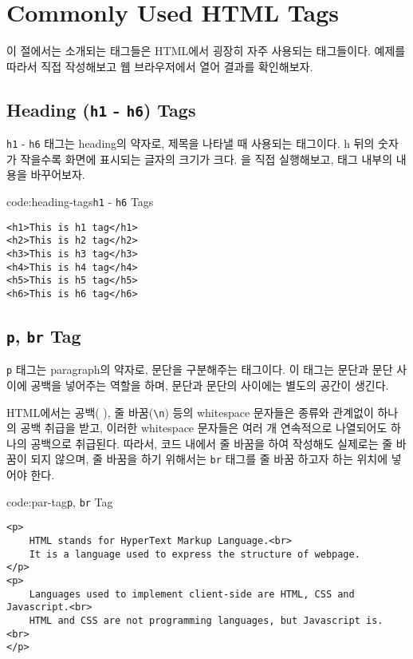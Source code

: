 \section{Commonly Used HTML Tags} \label{sect:commonly-used-html-tags}

이 절에서는 소개되는 태그들은 HTML에서 굉장히 자주 사용되는 태그들이다. 예제를 따라서 직접 작성해보고 웹 브라우저에서 열어 결과를 확인해보자.

\subsection*{Heading (\texttt{h1} - \texttt{h6}) Tags}
\texttt{h1} - \texttt{h6} 태그는 heading의 약자로, 제목을 나타낼 때 사용되는 태그이다. h 뒤의 숫자가 작을수록 화면에 표시되는 글자의 크기가 크다. 을 직접 실행해보고, 태그 내부의 내용을 바꾸어보자.

\begin{codeenv}{code:heading-tags}{\texttt{h1} - \texttt{h6} Tags}\begin{verbatim}
<h1>This is h1 tag</h1>
<h2>This is h2 tag</h2>
<h3>This is h3 tag</h3>
<h4>This is h4 tag</h4>
<h5>This is h5 tag</h5>
<h6>This is h6 tag</h6>
\end{verbatim}
\end{codeenv}

\subsection*{\texttt{p}, \texttt{br} Tag}
\texttt{p} 태그는 paragraph의 약자로, 문단을 구분해주는 태그이다. 이 태그는 문단과 문단 사이에 공백을 넣어주는 역할을 하며, 문단과 문단의 사이에는 별도의 공간이 생긴다. 

HTML에서는 공백( ), 줄 바꿈(\verb|\n|) 등의 whitespace 문자들은 종류와 관계없이 하나의 공백 취급을 받고, 이러한 whitespace 문자들은 여러 개 연속적으로 나열되어도 하나의 공백으로 취급된다. 따라서, 코드 내에서 줄 바꿈을 하여 작성해도 실제로는 줄 바꿈이 되지 않으며, 줄 바꿈을 하기 위해서는 \texttt{br} 태그를 줄 바꿈 하고자 하는 위치에 넣어야 한다. 

\begin{codeenv}{code:par-tag}{\texttt{p}, \texttt{br} Tag}\begin{verbatim}
<p>
    HTML stands for HyperText Markup Language.<br>
    It is a language used to express the structure of webpage.
</p>
<p>
    Languages used to implement client-side are HTML, CSS and Javascript.<br>
    HTML and CSS are not programming languages, but Javascript is. <br>
</p>
\end{verbatim}
\end{codeenv}

